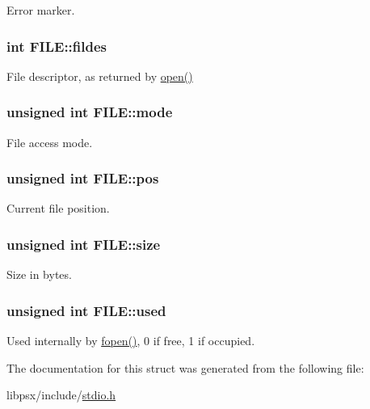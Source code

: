 Error marker. 

\hypertarget{structFILE_a03eb666eb26d69532cabfd9041848875}{}
\subsubsection[{fildes}]{\setlength{\rightskip}{0pt plus 5cm}int F\+I\+L\+E\+::fildes}\label{structFILE_a03eb666eb26d69532cabfd9041848875}


File descriptor, as returned by \hyperlink{fcntl_8h_a3ad75e4ab5b8343998fbdb4b40c0973b}{open()} 

\hypertarget{structFILE_ae65fa42375bf2dd80303a67a562d7783}{}
\subsubsection[{mode}]{\setlength{\rightskip}{0pt plus 5cm}unsigned int F\+I\+L\+E\+::mode}\label{structFILE_ae65fa42375bf2dd80303a67a562d7783}


File access mode. 

\hypertarget{structFILE_aad42c1377afb068e9c0f015961657a3c}{}
\subsubsection[{pos}]{\setlength{\rightskip}{0pt plus 5cm}unsigned int F\+I\+L\+E\+::pos}\label{structFILE_aad42c1377afb068e9c0f015961657a3c}


Current file position. 

\hypertarget{structFILE_a52a41fff17507a76ddf9cd7e1dc41379}{}
\subsubsection[{size}]{\setlength{\rightskip}{0pt plus 5cm}unsigned int F\+I\+L\+E\+::size}\label{structFILE_a52a41fff17507a76ddf9cd7e1dc41379}


Size in bytes. 

\hypertarget{structFILE_a4fe302cf95bc53156809770fd1cc4278}{}
\subsubsection[{used}]{\setlength{\rightskip}{0pt plus 5cm}unsigned int F\+I\+L\+E\+::used}\label{structFILE_a4fe302cf95bc53156809770fd1cc4278}


Used internally by \hyperlink{stdio_8h_a61171f829f6067fa0c9936fc4e0cbb82}{fopen()}, 0 if free, 1 if occupied. 



The documentation for this struct was generated from the following file\+:\begin{DoxyCompactItemize}
\item 
libpsx/include/\hyperlink{stdio_8h}{stdio.\+h}\end{DoxyCompactItemize}
